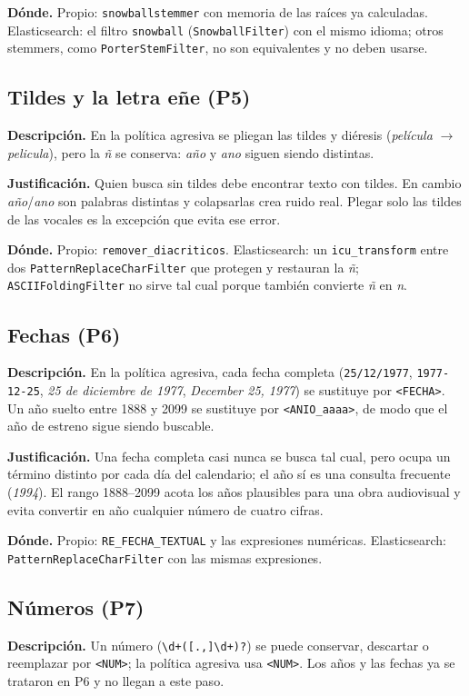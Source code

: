 \documentclass[11pt,spanish]{article}
\begin{document}
\textbf{Dónde.} Propio: \texttt{snowballstemmer} con memoria de las raíces ya calculadas. Elasticsearch: el filtro \texttt{snowball} (\texttt{SnowballFilter}) con el mismo idioma; otros stemmers, como \texttt{PorterStemFilter}, no son equivalentes y no deben usarse.

\subsection{Tildes y la letra eñe (P5)}
\textbf{Descripción.} En la política agresiva se pliegan las tildes y diéresis (\textit{película} $\to$ \textit{pelicula}), pero la \textit{ñ} se conserva: \textit{año} y \textit{ano} siguen siendo distintas.

\textbf{Justificación.} Quien busca sin tildes debe encontrar texto con tildes. En cambio \textit{año}/\textit{ano} son palabras distintas y colapsarlas crea ruido real. Plegar solo las tildes de las vocales es la excepción que evita ese error.

\textbf{Dónde.} Propio: \texttt{remover\_diacriticos}. Elasticsearch: un \texttt{icu\_transform} entre dos \texttt{PatternReplaceCharFilter} que protegen y restauran la \textit{ñ}; \texttt{ASCIIFoldingFilter} no sirve tal cual porque también convierte \textit{ñ} en \textit{n}.

\subsection{Fechas (P6)}
\textbf{Descripción.} En la política agresiva, cada fecha completa (\texttt{25/12/1977}, \texttt{1977-12-25}, \textit{25 de diciembre de 1977}, \textit{December 25, 1977}) se sustituye por \texttt{<FECHA>}. Un año suelto entre 1888 y 2099 se sustituye por \texttt{<ANIO\_aaaa>}, de modo que el año de estreno sigue siendo buscable.

\textbf{Justificación.} Una fecha completa casi nunca se busca tal cual, pero ocupa un término distinto por cada día del calendario; el año sí es una consulta frecuente (\textit{1994}). El rango 1888--2099 acota los años plausibles para una obra audiovisual y evita convertir en año cualquier número de cuatro cifras.

\textbf{Dónde.} Propio: \texttt{RE\_FECHA\_TEXTUAL} y las expresiones numéricas. Elasticsearch: \texttt{PatternReplaceCharFilter} con las mismas expresiones.

\subsection{Números (P7)}
\textbf{Descripción.} Un número (\texttt{\textbackslash d+([.,]\textbackslash d+)?}) se puede conservar, descartar o reemplazar por \texttt{<NUM>}; la política agresiva usa \texttt{<NUM>}. Los años y las fechas ya se trataron en P6 y no llegan a este paso.
\end{document}
